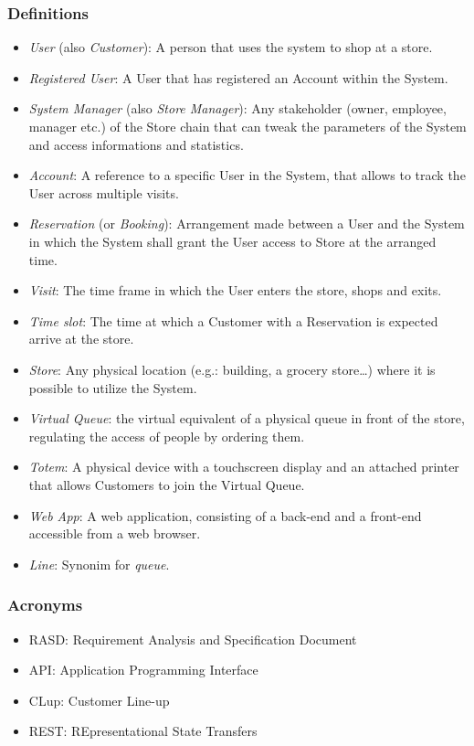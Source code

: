 \subsubsection{Definitions}
\begin{itemize}
    \item \emph{User} (also \emph{Customer}): A person that uses the system to shop at a store.
    \item \emph{Registered User}: A User that has registered an Account within the System.
    \item \emph{System Manager} (also \emph{Store Manager}): Any stakeholder (owner, employee, manager etc.) of the Store chain that can tweak the parameters of the System and access informations and statistics.
    \item \emph{Account}: A reference to a specific User in the System, that allows to track the User across multiple visits.
    \item \emph{Reservation} (or \emph{Booking}): Arrangement made between a User and the System in which the System shall grant the User access to Store at the arranged time.
    \item \emph{Visit}: The time frame in which the User enters the store, shops and exits.
    \item \emph{Time slot}: The time at which a Customer with a Reservation is expected arrive at the store.
    \item \emph{Store}: Any physical location (e.g.: building, a grocery store\dots) where it is possible to utilize the System.
    \item \emph{Virtual Queue}: the virtual equivalent of a physical queue in front of the store, regulating the access of people by ordering them.
    \item \emph{Totem}: A physical device with a touchscreen display and an attached printer that allows Customers to join the Virtual Queue.
    \item \emph{Web App}: A web application, consisting of a back-end and a front-end accessible from a web browser.
    \item \emph{Line}: Synonim for \emph{queue}.
\end{itemize}

\subsubsection{Acronyms}
\begin{itemize}
    \item RASD: Requirement Analysis and Specification Document
    \item API: Application Programming Interface
    \item CLup: Customer Line-up
    \item REST: REpresentational State Transfers
\end{itemize}


